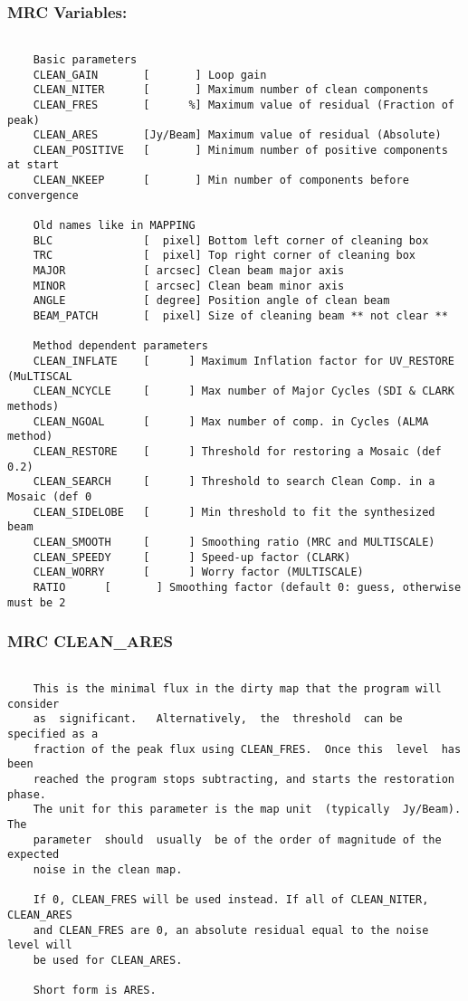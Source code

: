 \subsubsection{MRC Variables:}
\begin{verbatim}

    Basic parameters
    CLEAN_GAIN       [       ] Loop gain
    CLEAN_NITER      [       ] Maximum number of clean components
    CLEAN_FRES       [      %] Maximum value of residual (Fraction of peak)
    CLEAN_ARES       [Jy/Beam] Maximum value of residual (Absolute)
    CLEAN_POSITIVE   [       ] Minimum number of positive components at start
    CLEAN_NKEEP      [       ] Min number of components before convergence

    Old names like in MAPPING
    BLC              [  pixel] Bottom left corner of cleaning box
    TRC              [  pixel] Top right corner of cleaning box
    MAJOR            [ arcsec] Clean beam major axis
    MINOR            [ arcsec] Clean beam minor axis
    ANGLE            [ degree] Position angle of clean beam
    BEAM_PATCH       [  pixel] Size of cleaning beam ** not clear **

    Method dependent parameters
    CLEAN_INFLATE    [      ] Maximum Inflation factor for UV_RESTORE (MuLTISCAL
    CLEAN_NCYCLE     [      ] Max number of Major Cycles (SDI & CLARK methods)
    CLEAN_NGOAL      [      ] Max number of comp. in Cycles (ALMA method)
    CLEAN_RESTORE    [      ] Threshold for restoring a Mosaic (def 0.2)
    CLEAN_SEARCH     [      ] Threshold to search Clean Comp. in a Mosaic (def 0
    CLEAN_SIDELOBE   [      ] Min threshold to fit the synthesized beam
    CLEAN_SMOOTH     [      ] Smoothing ratio (MRC and MULTISCALE)
    CLEAN_SPEEDY     [      ] Speed-up factor (CLARK)
    CLEAN_WORRY      [      ] Worry factor (MULTISCALE)
    RATIO      [       ] Smoothing factor (default 0: guess, otherwise must be 2
\end{verbatim}
\subsubsection{MRC CLEAN\_ARES}
\begin{verbatim}

    This is the minimal flux in the dirty map that the program will consider
    as  significant.   Alternatively,  the  threshold  can be specified as a
    fraction of the peak flux using CLEAN_FRES.  Once this  level  has  been
    reached the program stops subtracting, and starts the restoration phase.
    The unit for this parameter is the map unit  (typically  Jy/Beam).   The
    parameter  should  usually  be of the order of magnitude of the expected
    noise in the clean map.

    If 0, CLEAN_FRES will be used instead. If all of CLEAN_NITER, CLEAN_ARES
    and CLEAN_FRES are 0, an absolute residual equal to the noise level will
    be used for CLEAN_ARES.

    Short form is ARES.

\end{verbatim}
